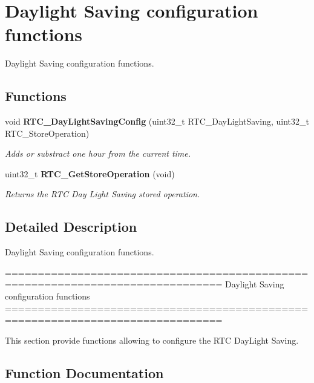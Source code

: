 \section{Daylight Saving configuration functions}
\label{group__RTC__Group5}


Daylight Saving configuration functions.  


\subsection*{Functions}
\begin{DoxyCompactItemize}
\item 
void \textbf{ R\+T\+C\+\_\+\+Day\+Light\+Saving\+Config} (uint32\+\_\+t R\+T\+C\+\_\+\+Day\+Light\+Saving, uint32\+\_\+t R\+T\+C\+\_\+\+Store\+Operation)
\begin{DoxyCompactList}\small\item\em Adds or substract one hour from the current time. \end{DoxyCompactList}\item 
uint32\+\_\+t \textbf{ R\+T\+C\+\_\+\+Get\+Store\+Operation} (void)
\begin{DoxyCompactList}\small\item\em Returns the R\+TC Day Light Saving stored operation. \end{DoxyCompactList}\end{DoxyCompactItemize}


\subsection{Detailed Description}
Daylight Saving configuration functions. 

\begin{DoxyVerb} ===============================================================================
                    Daylight Saving configuration functions
 ===============================================================================  

  This section provide functions allowing to configure the RTC DayLight Saving.\end{DoxyVerb}
 

\subsection{Function Documentation}
\mbox{\label{group__RTC__Group5_ga812feddea77990b5dc336a4989ae61b8}} 
